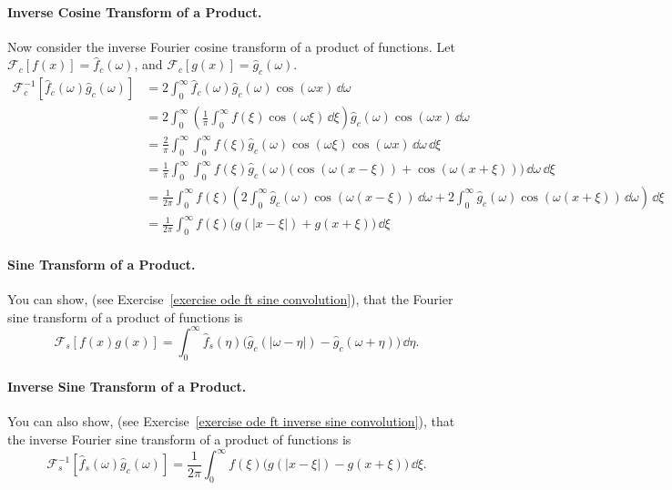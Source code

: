 \paragraph{Inverse Cosine Transform of a Product.}
Now consider the inverse Fourier cosine transform of a product of functions.
Let $\mathcal{F}_c[f(x)] = \hat{f}_c(\omega)$, and 
$\mathcal{F}_c[g(x)] = \hat{g}_c(\omega)$.
\begin{align*}
  \mathcal{F}_c^{-1}[\hat{f}_c(\omega) \hat{g}_c(\omega)]
  &= 2 \int_0^\infty \hat{f}_c(\omega) \hat{g}_c(\omega) \cos(\omega x)\,\dd \omega 
  \\
  &= 2 \int_0^\infty \left( \frac{1}{\pi} \int_0^\infty f(\xi) \cos(\omega \xi)\,\dd \xi
  \right) \hat{g}_c(\omega) \cos(\omega x)\,\dd \omega 
  \\
  &= \frac{2}{\pi} \int_0^\infty \int_0^\infty f(\xi) \hat{g}_c(\omega) \cos(\omega \xi) \cos(\omega x)\,\dd \omega \,\dd \xi 
  \\
  &= \frac{1}{\pi} \int_0^\infty \int_0^\infty f(\xi) \hat{g}_c(\omega) \big(\cos(\omega(x-\xi)) + \cos(\omega(x+\xi))
  \big)\,\dd \omega\,\dd \xi 
  \\
  &= \frac{1}{2\pi}\int_0^\infty f(\xi) \left( 2 \int_0^\infty \hat{g}_c(\omega) 
    \cos(\omega(x-\xi))\,\dd \omega + 2 \int_0^\infty \hat{g}_c(\omega)
    \cos(\omega(x+\xi))\,\dd \omega \right) \,\dd \xi 
  \\
  &= \frac{1}{2\pi}\int_0^\infty f(\xi) \big(g(|x-\xi|) + g(x+\xi)\big)\,\dd \xi
\end{align*}


\paragraph{Sine Transform of a Product.}
You can show, (see Exercise~\ref{exercise ode ft sine convolution}),
that the Fourier sine transform of a product of functions is
\[ 
\mathcal{F}_s[f(x)g(x)] = \int_0^\infty \hat{f}_s(\eta) \big(\hat{g}_c(|\omega-\eta|)
- \hat{g}_c(\omega+\eta) \big) \,\dd \eta.  
\]

\paragraph{Inverse Sine Transform of a Product.}
You can also show, (see 
Exercise~\ref{exercise ode ft inverse sine convolution}),
that the inverse Fourier sine transform of a product of functions is
\[ 
\mathcal{F}_s^{-1}[\hat{f}_s(\omega) \hat{g}_c(\omega)] 
= \frac{1}{2\pi} \int_0^\infty f(\xi) \big(g(|x-\xi|) - g(x+\xi) \big) \,\dd \xi.
\]


